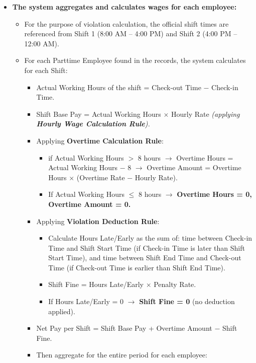 \begin{itemize}
\begin{itemize}
        \item \textbf{The system aggregates and calculates wages for each employee:}
        \begin{itemize}
            \item For the purpose of violation calculation, the official shift times are referenced from Shift 1 (8:00 AM -- 4:00 PM) and Shift 2 (4:00 PM -- 12:00 AM).
            \item For each Parttime Employee found in the records, the system calculates for each Shift:
            \begin{itemize}
                \item Actual Working Hours of the shift = Check-out Time $-$ Check-in Time.
                \item Shift Base Pay = Actual Working Hours $\times$ Hourly Rate \textit{(applying \textbf{Hourly Wage Calculation Rule}).}
                \item Applying \textbf{Overtime Calculation Rule}:
                \begin{itemize}
                    \item if Actual Working Hours $>$ 8 hours $\rightarrow$ Overtime Hours = Actual Working Hours $-$ 8 $\rightarrow$ Overtime Amount = Overtime Hours $\times$ (Overtime Rate $-$ Hourly Rate).
                    \item If Actual Working Hours $\leq$ 8 hours $\rightarrow$ \textbf{Overtime Hours = 0, Overtime Amount = 0.}
                \end{itemize}
                \item Applying \textbf{Violation Deduction Rule}:
                \begin{itemize}
                    \item Calculate Hours Late/Early as the sum of: time between Check-in Time and Shift Start Time (if Check-in Time is later than Shift Start Time), and time between Shift End Time and Check-out Time (if Check-out Time is earlier than Shift End Time).
                    \item Shift Fine = Hours Late/Early $\times$ Penalty Rate.
                    \item If Hours Late/Early = 0 $\rightarrow$ \textbf{Shift Fine = 0} (no deduction applied).
                \end{itemize}
                \item Net Pay per Shift = Shift Base Pay + Overtime Amount $-$ Shift Fine.
                \item Then aggregate for the entire period for each employee:

\end{itemize}
\end{itemize}
\end{itemize}
\end{itemize}
